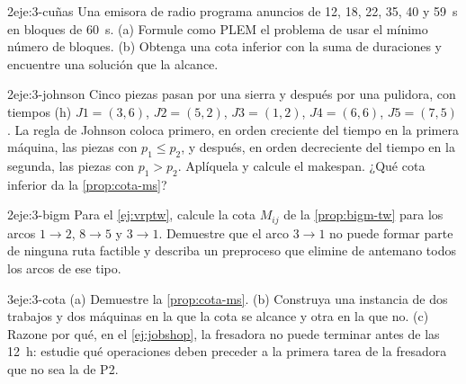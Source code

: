 \begin{ejercicio}{2}{eje:3-cuñas}
Una emisora de radio programa anuncios de 12, 18, 22, 35, 40 y 59~s en bloques de 60~s. (a) Formule como PLEM el problema de usar el mínimo número de bloques. (b) Obtenga una cota inferior con la suma de duraciones y encuentre una solución que la alcance.
\end{ejercicio}

\begin{ejercicio}{2}{eje:3-johnson}
Cinco piezas pasan por una sierra y después por una pulidora, con tiempos (h) $J1=(3,6)$, $J2=(5,2)$, $J3=(1,2)$, $J4=(6,6)$, $J5=(7,5)$. La regla de Johnson coloca primero, en orden creciente del tiempo en la primera máquina, las piezas con $p_1\le p_2$, y después, en orden decreciente del tiempo en la segunda, las piezas con $p_1>p_2$. Aplíquela y calcule el makespan. ¿Qué cota inferior da la \cref{prop:cota-ms}?
\end{ejercicio}

\begin{ejercicio}{2}{eje:3-bigm}
Para el \cref{ej:vrptw}, calcule la cota $M_{ij}$ de la \cref{prop:bigm-tw} para los arcos $1\to 2$, $8\to 5$ y $3\to 1$. Demuestre que el arco $3\to 1$ no puede formar parte de ninguna ruta factible y describa un preproceso que elimine de antemano todos los arcos de ese tipo.
\end{ejercicio}

\begin{ejercicio}{3}{eje:3-cota}
(a) Demuestre la \cref{prop:cota-ms}. (b) Construya una instancia de dos trabajos y dos máquinas en la que la cota se alcance y otra en la que no. (c) Razone por qué, en el \cref{ej:jobshop}, la fresadora no puede terminar antes de las 12~h: estudie qué operaciones deben preceder a la primera tarea de la fresadora que no sea la de P2.
\end{ejercicio}
